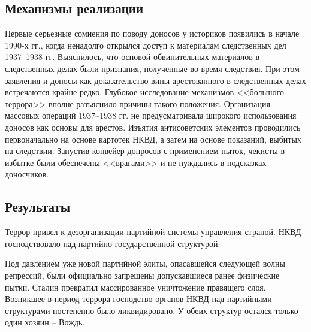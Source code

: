 \documentclass[12pt]{article}
\newcommand{\teal}[1]{{\color{teal}{#1}}}
\begin{document}
  \subsection{Механизмы реализации}
  \teal{тут было написано что доносы это миф}

  Первые серьезные сомнения по поводу доносов у историков появились в начале 1990-х гг.,
  когда ненадолго открылся доступ к материалам следственных дел 1937--1938 гг.
  Выяснилось, что основой обвинительных материалов в следственных делах были признания, полученные во время следствия.
  При этом заявления и доносы как доказательство вины арестованного в следственных делах встречаются крайне редко.
  Глубокое исследование механизмов <<большого террора>> вполне разъяснило причины такого положения.
  Организация массовых операций 1937--1938 гг. не предусматривала широкого использования доносов как основы для арестов.
  Изъятия антисоветских элементов проводились первоначально на основе картотек НКВД, а затем на основе показаний, выбитых на следствии.
  Запустив конвейер допросов с применением пыток, чекисты в избытке были обеспечены <<врагами>> и не нуждались в подсказках доносчиков.

  \subsection{Результаты}
  Террор привел к дезорганизации партийной системы управления страной.
  НКВД господствовало над партийно-государственной структурой.

  Под давлением уже новой партийной элиты, опасавшейся следующей волны репрессий, были официально запрещены допускавшиеся ранее физические пытки.
  Сталин прекратил массированное уничтожение правящего слоя.
  Возникшее в период террора господство органов НКВД над партийными структурами постепенно было ликвидировано.
  У обеих структур остался только один хозяин -- Вождь.

  \teal{тут можно ещё сказать что Советско-финляндская война была настолько провальной, потомучто небыло нармальных генералов, тк их всех растреляли}

\end{document}
